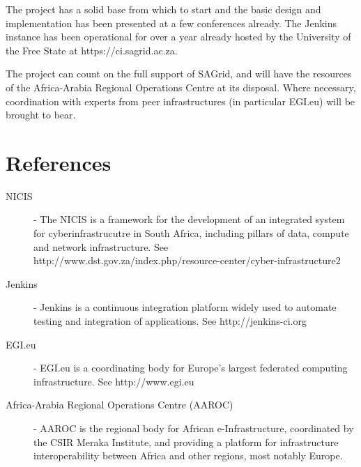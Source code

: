 \documentclass[oneside, a4paper, onecolumn, 11pt]{article}
\begin{document}
The project has a solid base from which to start and the basic design and implementation has been presented at a few conferences already. The Jenkins instance has been operational for over a year already hosted by the University of the Free State at https://ci.sagrid.ac.za.

The project can count on the full support of SAGrid, and will have the resources of the Africa-Arabia Regional Operations Centre at its disposal. Where necessary, coordination with experts from peer infrastructures (in particular EGI.eu) will be brought to bear.


\section{References}

\begin{description}
  \item[NICIS] - The NICIS is a framework for the development of an integrated system for cyberinfrastrucutre in South Africa, including pillars of data, compute and network infrastructure. See http://www.dst.gov.za/index.php/resource-center/cyber-infrastructure2
  \item[Jenkins] - Jenkins is a continuous integration platform widely used to automate testing and integration of applications. See http://jenkins-ci.org
  \item[EGI.eu] - EGI.eu is a coordinating body for Europe's largest federated computing infrastructure. See http://www.egi.eu
  \item[Africa-Arabia Regional Operations Centre (AAROC)] - AAROC is the regional body for African e-Infrastructure, coordinated by the CSIR Meraka Institute, and providing a platform for infrastructure interoperability between Africa and other regions, most notably Europe.
\end{description}

\begin{small}

\end{small}
\end{document}
